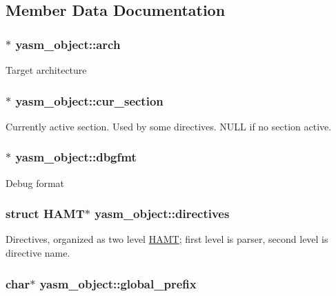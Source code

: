 \subsection{Member Data Documentation}
\hypertarget{structyasm__object_a3613b1529c376dff8dfb24f97e3456e9}{
\subsubsection[{arch}]{$\ast$ yasm\-\_\-object\-::arch}}\label{structyasm__object_a3613b1529c376dff8dfb24f97e3456e9}
Target architecture \hypertarget{structyasm__object_a355bebcbf4c02847afac47903c9c9e3a}{
\subsubsection[{cur\-\_\-section}]{$\ast$ yasm\-\_\-object\-::cur\-\_\-section}}\label{structyasm__object_a355bebcbf4c02847afac47903c9c9e3a}
Currently active section. Used by some directives. N\-U\-L\-L if no section active. \hypertarget{structyasm__object_a7da056c1035bff2c27ba4619d0373153}{
\subsubsection[{dbgfmt}]{$\ast$ yasm\-\_\-object\-::dbgfmt}}\label{structyasm__object_a7da056c1035bff2c27ba4619d0373153}
Debug format \hypertarget{structyasm__object_afad452bed93725ffad7e65227822bb4b}{
\subsubsection[{directives}]{\setlength{\rightskip}{0pt plus 5cm}struct {\bf H\-A\-M\-T}$\ast$ yasm\-\_\-object\-::directives}}\label{structyasm__object_afad452bed93725ffad7e65227822bb4b}
Directives, organized as two level \hyperlink{struct_h_a_m_t}{H\-A\-M\-T}; first level is parser, second level is directive name. \hypertarget{structyasm__object_af563dc940847d21c144ca7af8fdbd3fe}{
\subsubsection[{global\-\_\-prefix}]{\setlength{\rightskip}{0pt plus 5cm}char$\ast$ yasm\-\_\-object\-::global\-\_\-prefix}}\label{structyasm__object_af563dc940847d21c144ca7af8fdbd3fe}
